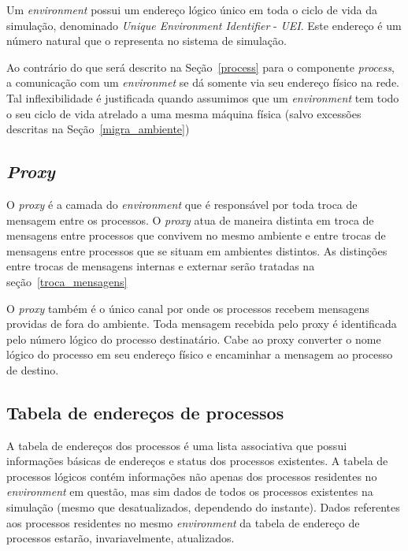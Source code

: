 Um \textit{environment} possui um endereço lógico único em toda o ciclo de vida da simulação, denominado \textit{Unique Environment Identifier} - \textit{UEI}. Este endereço é um número natural que o representa no sistema de simulação.

Ao contrário do que será descrito na Seção~\ref{process} para o componente \textit{process}, a comunicação com um \textit{environmet} se dá somente via seu endereço físico na rede. Tal inflexibilidade é justificada quando assumimos que um \textit{environment} tem todo o seu ciclo de vida atrelado a uma mesma máquina física (salvo excessões descritas na Seção~\ref{migra_ambiente})

\subsection{\textit{Proxy}}

O \textit{proxy} é a camada do \textit{environment} que é responsável por toda troca de mensagem entre os processos. O \textit{proxy} atua de maneira distinta em troca de mensagens entre processos que convivem no mesmo ambiente e entre trocas de mensagens entre processos que se situam em ambientes distintos. As distinções entre trocas de mensagens internas e externar serão tratadas na seção~\ref{troca_mensagens}

O \textit{proxy} também é o único canal por onde os processos recebem mensagens providas de fora do ambiente. Toda mensagem recebida pelo proxy é identificada pelo número lógico do processo destinatário. Cabe ao proxy converter o nome lógico do processo em seu endereço físico e encaminhar a mensagem ao processo de destino.

\subsection{Tabela de endereços de processos}

A tabela de endereços dos processos é uma lista associativa que possui informações básicas de endereços e status dos processos existentes. A tabela de processos lógicos contém informações não apenas dos processos residentes no \textit{environment} em questão, mas sim dados de todos os processos existentes na simulação (mesmo que desatualizados, dependendo do instante). Dados referentes aos processos residentes no mesmo \textit{environment} da tabela de endereço de processos estarão, invariavelmente, atualizados.

